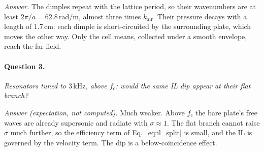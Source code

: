 \emph{Answer.} The dimples repeat with the lattice period, so their wavenumbers are at
least $2\pi/a = 62.8\,\mathrm{rad/m}$, almost three times $k_\mathrm{air}$. Their
pressure decays with a length of $1.7\,\mathrm{cm}$: each dimple is short-circuited by
the surrounding plate, which moves the other way. Only the cell means, collected under
a smooth envelope, reach the far field.

\paragraph{Question 3.} \emph{Resonators tuned to $3\,\mathrm{kHz}$, above $f_c$: would
the same IL dip appear at their flat branch?}

\emph{Answer (expectation, not computed).} Much weaker. Above $f_c$ the bare plate's
free waves are already supersonic and radiate with $\sigma \approx 1$. The flat branch
cannot raise $\sigma$ much further, so the efficiency term of
Eq.~\eqref{eq:il_split} is small, and the IL is governed by the velocity term. The dip
is a below-coincidence effect.
